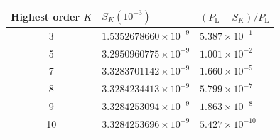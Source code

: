 \begin{tabular}{@{}c|l|l@{}}
\toprule
\shortstack{Highest order\\$K$} & $S_K(10^{-3})$ & $(P_{\mathrm L}-S_K)/P_{\mathrm L}$ \\
\midrule
3 & $1.5352678660\times10^{-9}$ & $5.387\times10^{-1}$ \\
5 & $3.2950960775\times10^{-9}$ & $1.001\times10^{-2}$ \\
7 & $3.3283701142\times10^{-9}$ & $1.660\times10^{-5}$ \\
8 & $3.3284234413\times10^{-9}$ & $5.799\times10^{-7}$ \\
9 & $3.3284253094\times10^{-9}$ & $1.863\times10^{-8}$ \\
10 & $3.3284253696\times10^{-9}$ & $5.427\times10^{-10}$ \\
\bottomrule
\end{tabular}
